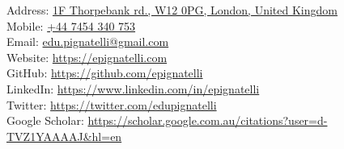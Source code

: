     Address: \href{https://goo.gl/maps/Gwa9BTP2ARx}{1F Thorpebank rd., W12 0PG, London, United Kingdom} \\
    Mobile: \href{tel:07454340753}{+44 7454 340 753} \\
    Email:  \href{mailto:edu.pignatelli@gmail.com}{edu.pignatelli@gmail.com} \\
    Website: \href{https://epignatelli.com}{https://epignatelli.com} \\
    GitHub: \href{https://github.com/epignatelli}{https://github.com/epignatelli} \\
    LinkedIn: \href{https://www.linkedin.com/in/epignatelli}{https://www.linkedin.com/in/epignatelli} \\
    Twitter: \href{https://twitter.com/edupignatelli}{https://twitter.com/edupignatelli} \\
    Google Scholar: \href{https://scholar.google.com.au/citations?user=d-TVZ1YAAAAJ\&hl=en}{https://scholar.google.com.au/citations?user=d-TVZ1YAAAAJ\&hl=en}

    \vspace{1em}

